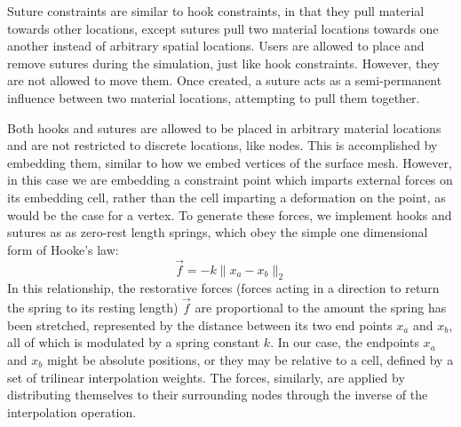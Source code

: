   Suture constraints are similar to hook constraints, in that they
  pull material towards other locations, except sutures pull two
  material locations towards one another instead of arbitrary spatial
  locations. Users are allowed to place and remove sutures during the
  simulation, just like hook constraints. However, they are not
  allowed to move them. Once created, a suture acts as a
  semi-permanent influence between two material locations, attempting
  to pull them together.

  Both hooks and sutures are allowed to be placed in arbitrary
  material locations and are not restricted to discrete locations,
  like nodes. This is accomplished by embedding them, similar to how
  we embed vertices of the surface mesh. However, in this case we are
  embedding a constraint point which imparts external forces on its
  embedding cell, rather than the cell imparting a deformation on the
  point, as would be the case for a vertex. To generate these forces,
  we implement hooks and sutures as as zero-rest length springs, which obey
  the simple one dimensional form of Hooke's law:
  \begin{equation}
    \label{equ:hookeslaw}
    \vec{f} = -k\lVert x_a - x_b\rVert_2
  \end{equation}
  In this relationship, the restorative forces (forces acting in a
  direction to return the spring to its resting length) $\vec f$ are
  proportional to the amount the spring has been stretched,
  represented by the distance between its two end points $x_a$ and
  $x_b$, all of which is modulated by a spring constant $k$. In our
  case, the endpoints $x_a$ and $x_b$ might be absolute positions, or
  they may be relative to a cell, defined by a set of trilinear
  interpolation weights. The forces, similarly, are applied by
  distributing themselves to their surrounding nodes through the
  inverse of the interpolation operation.

